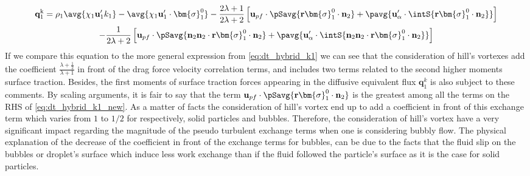 \begin{multline*}
    \textbf{q}_1^\text{k}
    = \rho_1 \avg{\chi_1 \textbf{u}_1' k_1} 
    - \avg{\chi_1 \textbf{u}_1' \cdot \bm{\sigma}_1^0}
    - \frac{2\lambda +1}{2\lambda +2} 
    \left[
        \textbf{u}_{pf}
        \cdot \pSavg{\textbf{r}\bm{\sigma}_1^0 \cdot \textbf{n}_2}
        + \pavg{ \textbf{u}_\alpha' \cdot \intS{ \textbf{r} \bm{\sigma}_1^0 \cdot \textbf{n}_2}}
    \right]\\
    - \frac{1}{2\lambda+2}\left[
        \textbf{u}_{p f} \cdot\pSavg{\textbf{n}_2\textbf{n}_2\cdot \textbf{r}\bm{\sigma}_1^0\cdot\textbf{n}_2}
        +
        \pavg{\textbf{u}_{\alpha}' \cdot \intS{\textbf{n}_2\textbf{n}_2\cdot \textbf{r}\bm{\sigma}_1^0\cdot\textbf{n}_2}}
    \right]
\end{multline*}
If we compare this equation to the more general expression from \ref{eq:dt_hybrid_k1} we can see that the consideration of hill's vortexes add the coefficient $\frac{\lambda +\frac{1}{2}}{\lambda+1}$ in front of the drag force velocity correlation terms, and includes two terms related to the second higher moments surface traction. 
Besides, the first moments of surface traction forces appearing in the diffusive equivalent flux $\textbf{q}_1^k$ is also subject to these comments.  
By scaling arguments, it is fair to say that the term  $\textbf{u}_{pf} \cdot \pSavg{\textbf{r}\bm{\sigma}_1^0 \cdot \textbf{n}_2}$ is the greatest among all the terms on the RHS of \ref{eq:dt_hybrid_k1_new}. 
As a matter of facts the consideration of hill's vortex end up to add a coefficient in front of this exchange term which varies from $1$ to $1/2$ for respectively, solid particles and bubbles.  
Therefore, the consideration of hill's vortex have a very significant impact regarding the magnitude of the pseudo turbulent exchange terms when one is considering bubbly flow. 
The physical explanation of the decrease of the coefficient in front of the exchange terms for bubbles, can be due to the facts that the fluid slip on the bubbles or droplet's surface which induce less work exchange than if the fluid followed the particle's surface as it is the case for solid particles. 

